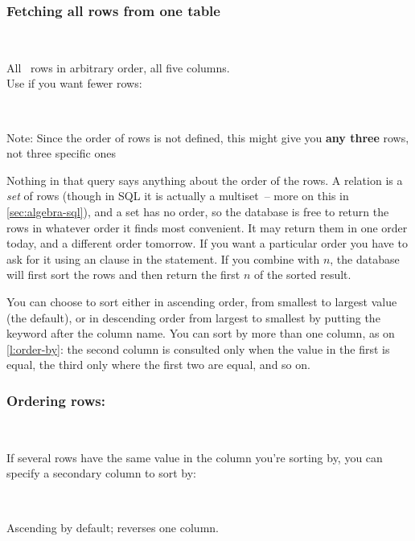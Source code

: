 \begin{frame}
    \label{s:select-all}
    \frametitle{Fetching all rows from one table}
    \inputminted[fontsize=\footnotesize]{sql}{code/sel-1-all.sql}
    \vspace{0.3em}
    {\scriptsize}\\[0.8em]
    All \dbrowsmovies\ rows in arbitrary order, all five columns.\\[1em]\pause
    Use  if you want fewer rows:
    \inputminted[fontsize=\footnotesize]{sql}{code/sel-2-limit.sql}
    \vspace{0.3em}
    {\scriptsize}\\[0.8em]
    Note: Since the order of rows is not defined, this might give you \textbf{any three} rows, not three specific ones
\end{frame}
\label{l:select-all}

Nothing in that query says anything about the order of the rows.
A relation is a \emph{set} of rows (though in SQL it is actually a multiset~-- more on this in \autoref{sec:algebra-sql}), and a set has no order, so the database is free to return the rows in whatever order it finds most convenient.
It may return them in one order today, and a different order tomorrow.
If you want a particular order you have to ask for it using an  clause in the  statement.
If you combine  with  $n$, the database will first sort the rows and then return the first $n$ of the sorted result.

You can choose to sort either in ascending order, from smallest to largest value (the default), or in descending order from largest to smallest by putting the  keyword after the column name.
You can sort by more than one column, as on \autoref{l:order-by}: the second column is consulted only when the value in the first is equal, the third only where the first two are equal, and so on.

\begin{frame}
    \label{s:order-by}
    \frametitle{Ordering rows: }
    \inputminted[fontsize=\footnotesize]{sql}{code/sel-3-order.sql}
    \vspace{0.3em}
    {\scriptsize}\\[2em]\pause
    If several rows have the same value in the column you're sorting by, you can specify a secondary column to sort by:
    \inputminted[fontsize=\footnotesize]{sql}{code/sel-3b-order2.sql}
    \vspace{0.3em}
    {\scriptsize}\\[0.5em]
    Ascending by default;  reverses one column.
\end{frame}
\label{l:order-by}


